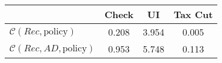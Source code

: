 \begin{tabular}{@{}lccc@{}} 
\toprule 
                          & Check      & UI    & Tax Cut    \\  \midrule 
$\mathcal{C}(Rec,\text{policy})$ & 0.208  & 3.954  & 0.005     \\ 
$\mathcal{C}(Rec, AD,\text{policy})$ & 0.953  & 5.748  & 0.113     \\ 
\end{tabular}  
